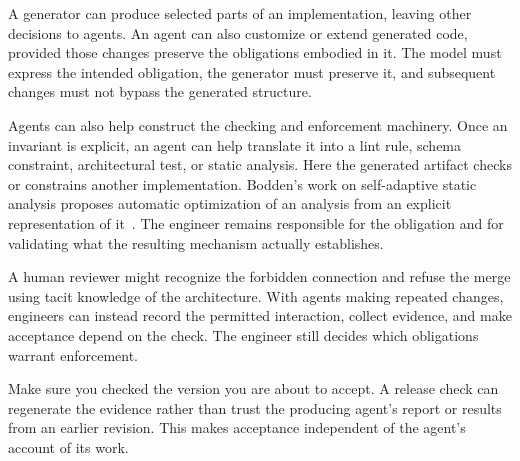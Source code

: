 A generator can produce selected parts of an implementation, leaving other decisions to agents. An agent can also customize or extend generated code, provided those changes preserve the obligations embodied in it. The model must express the intended obligation, the generator must preserve it, and subsequent changes must not bypass the generated structure.


Agents can also help construct the checking and enforcement machinery. Once an invariant is explicit, an agent can help translate it into a lint rule, schema constraint, architectural test, or static analysis. Here the generated artifact checks or constrains another implementation. Bodden's work on self-adaptive static analysis proposes automatic optimization of an analysis from an explicit representation of it~\citep{bodden2018,bodden2023sosa}. The engineer remains responsible for the obligation and for validating what the resulting mechanism actually establishes.


A human reviewer might recognize the forbidden connection and refuse the merge using tacit knowledge of the architecture. With agents making repeated changes, engineers can instead record the permitted interaction, collect evidence, and make acceptance depend on the check. The engineer still decides which obligations warrant enforcement.


Make sure you checked the version you are about to accept. A release check can regenerate the evidence rather than trust the producing agent's report or results from an earlier revision. This makes acceptance independent of the agent's account of its work.


